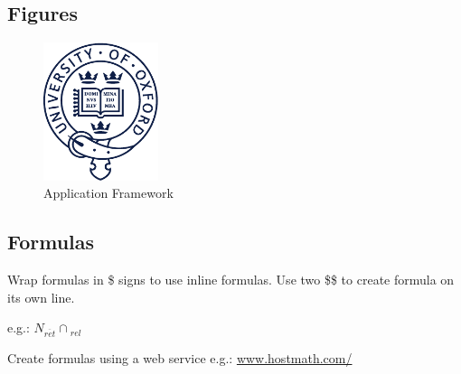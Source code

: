 \subsection{Figures}

\begin{figure}[H] %
  \vspace{5mm}
  \centering
  \includegraphics[width=0.3\textwidth]{figures/beltcrest.pdf}
  \caption{Application Framework}
  \label{fig:app-framework}
\end{figure}


\subsection{Formulas}
Wrap formulas in \$ signs to use inline formulas. Use two \$\$ to create formula on its own line.

e.g.: $N {_\overline{ret}} \cap {_{rel}}$

Create formulas using a web service e.g.: \url{www.hostmath.com/}
